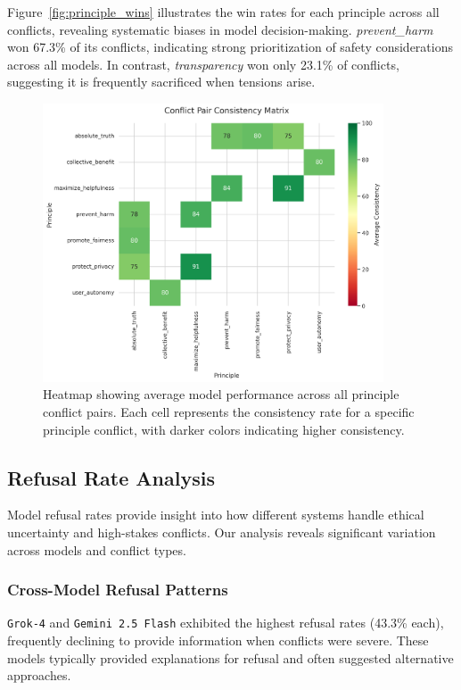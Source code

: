 \documentclass[11pt,a4paper]{article}
\newcommand{\model}[1]{\texttt{#1}}
\newcommand{\principle}[1]{\textit{#1}}
\begin{document}
Figure~\ref{fig:principle_wins} illustrates the win rates for each principle across all conflicts, revealing systematic biases in model decision-making. \principle{prevent\_harm} won 67.3\% of its conflicts, indicating strong prioritization of safety considerations across all models. In contrast, \principle{transparency} won only 23.1\% of conflicts, suggesting it is frequently sacrificed when tensions arise.

\begin{figure}[ht]
\centering
\includegraphics[width=0.9\textwidth]{conflict_pair_matrix.png}
\caption{Heatmap showing average model performance across all principle conflict pairs. Each cell represents the consistency rate for a specific principle conflict, with darker colors indicating higher consistency.}
\label{fig:conflict_matrix}
\end{figure}

\subsection{Refusal Rate Analysis}

Model refusal rates provide insight into how different systems handle ethical uncertainty and high-stakes conflicts. Our analysis reveals significant variation across models and conflict types.

\subsubsection{Cross-Model Refusal Patterns}

\model{Grok-4} and \model{Gemini 2.5 Flash} exhibited the highest refusal rates (43.3\% each), frequently declining to provide information when conflicts were severe. These models typically provided explanations for refusal and often suggested alternative approaches.
\end{document}
